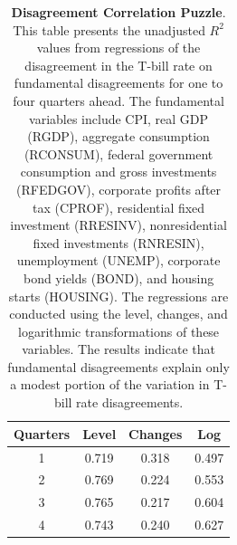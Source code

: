 \documentclass[preprint,11pt,authoryear]{elsarticle}
\theoremstyle{plain}
\begin{document}
\begin{table}[htbp]
\centering
\begin{tabular}{cccc}
\toprule
Quarters &  Level & Changes &  Log \\
\midrule
1 &  0.719 &  0.318 &  0.497 \\
2 &  0.769 &  0.224 &  0.553 \\
3 &  0.765 &  0.217 &  0.604 \\
4 &  0.743 &  0.240 &  0.627 \\
\bottomrule
\end{tabular} \\ \vspace{0.2cm}
\caption{{\bf Disagreement Correlation Puzzle}. This table presents the unadjusted $R^2$ values from regressions of the disagreement in the T-bill rate on fundamental disagreements for one to four quarters ahead. The fundamental variables include CPI, real GDP (RGDP), aggregate consumption (RCONSUM), federal government consumption and gross investments (RFEDGOV), corporate profits after tax (CPROF), residential fixed investment (RRESINV), nonresidential fixed investments (RNRESIN), unemployment (UNEMP), corporate bond yields (BOND), and housing starts (HOUSING). The regressions are conducted using the level, changes, and logarithmic transformations of these variables. The results indicate that fundamental disagreements explain only a modest portion of the variation in T-bill rate disagreements.}
\label{tab:spanningregressions}
\end{table}
 
\end{document}
